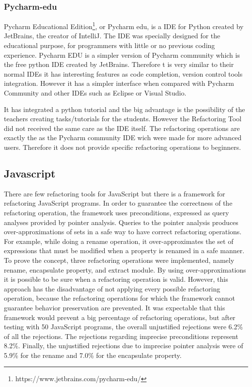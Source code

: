   \subsubsection{Pycharm-edu} %
  Pycharm Educational Edition\footnote{https://www.jetbrains.com/pycharm-edu/},
   or Pycharm edu, is a IDE for Python created by JetBrains,
  the creator of IntelliJ.
  The IDE was specially designed for the educational purpose, for programmers
  with little or no previous coding experience.
  Pycharm EDU is a simpler version of Pycharm community which is the free
  python IDE created by JetBrains.
  Therefore t is very similar to their normal IDEs it has interesting features
  as code completion, version control tools integration.
  However it has a simpler interface when compared with
  Pycharm Community and other IDEs such as Eclipse or Visual Studio. %

  It has integrated a python tutorial and the big advantage is the possibility of
  the teachers creating tasks/tutorials for the students.
  However the Refactoring Tool did not received the same care as the IDE itself.
  The refactoring operations are exactly the as the Pycharm community IDE wich were made
  for more advanced users.
  Therefore it does not provide specific refactoring operations to beginners.
\subsection{Javascript}
There are few refactoring tools for JavaScript but there is a framework
\cite{feldthaus2011tool} for refactoring JavaScript programs. %
In order to guarantee the correctness of the refactoring operation, the framework
uses preconditions, expressed as query analyses provided by pointer analysis. %
Queries to the pointer analysis produces over-approximations of sets in a safe way to
have correct refactoring operations.
For example, while doing a rename operation, it over-approximates the set of expressions
that must be modified when a property is renamed in a safe manner.
To prove the concept, three refactoring operations were implemented, namely rename,
encapsulate property, and extract module.
By using over-approximations it is possible to be sure when a refactoring
operation is valid.
However, this approach has the disadvantage of not applying every possible refactoring operation,
because the refactoring operations for which the framework cannot guarantee behavior
preservation are prevented.%
It was expectable that this framework would prevent a big percentage of refactoring
operations, but after testing with 50 JavaScript programs,
the overall unjustified rejections were 6.2\% of all the rejections.
The rejections regarding imprecise preconditions represent 8.2\%.
Finally, the unjustified rejections due to imprecise pointer analysis were of
5.9\% for the rename and 7.0\% for the encapsulate property.






